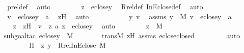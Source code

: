 \begin{isabellebody}
\ prel{\isacharunderscore}{\kern0pt}def\ \isamarkupfalse%
\ auto\ \isanewline
\ \ \ \ \isamarkupfalse%
\ \isamarkupfalse%
\ {\isachardoublequoteopen}z\ {\isasymin}\ eclose{\isacharparenleft}{\kern0pt}y{\isacharparenright}{\kern0pt}{\isachardoublequoteclose}\ \isamarkupfalse%
\ Rrel{\isacharunderscore}{\kern0pt}def\ InEclose{\isacharunderscore}{\kern0pt}def\ \isamarkupfalse%
\ auto\ \isanewline
\ \ \ \ \isamarkupfalse%
\ \isamarkupfalse%
\ {\isachardoublequoteopen}v\ {\isasymin}\ eclose{\isacharparenleft}{\kern0pt}y{\isacharparenright}{\kern0pt}\ {\isasymtimes}\ {\isacharbraceleft}{\kern0pt}a{\isacharbraceright}{\kern0pt}{\isachardoublequoteclose}\ \isamarkupfalse%
\ zH\ \isamarkupfalse%
\ auto\ \isanewline
\ \ \isamarkupfalse%
\ \isanewline
\ \ \ \ \isamarkupfalse%
\ y\ v\ \isamarkupfalse%
\ assms{}{\isacharcolon}{\kern0pt}\ {\isachardoublequoteopen}y\ {\isasymin}\ M{\isachardoublequoteclose}\ {\isachardoublequoteopen}v\ {\isasymin}\ eclose{\isacharparenleft}{\kern0pt}y{\isacharparenright}{\kern0pt}\ {\isasymtimes}\ {\isacharbraceleft}{\kern0pt}a{\isacharbraceright}{\kern0pt}{\isachardoublequoteclose}\ \isanewline
\ \ \ \ \isamarkupfalse%
\ \isamarkupfalse%
\ z\ \ zH\ {\isacharcolon}{\kern0pt}\ {\isachardoublequoteopen}v\ {\isacharequal}{\kern0pt}\ {\isacharless}{\kern0pt}z{\isacharcomma}{\kern0pt}\ a{\isachargreater}{\kern0pt}{\isachardoublequoteclose}\ {\isachardoublequoteopen}z\ {\isasymin}\ eclose{\isacharparenleft}{\kern0pt}y{\isacharparenright}{\kern0pt}{\isachardoublequoteclose}\ \isamarkupfalse%
\ auto\ \isanewline
\ \ \ \ \isamarkupfalse%
\ \isamarkupfalse%
\ {\isachardoublequoteopen}z\ {\isasymin}\ M{\isachardoublequoteclose}\ \isanewline
\ \ \ \ \ \ \isamarkupfalse%
{\isacharparenleft}{\kern0pt}subgoal{\isacharunderscore}{\kern0pt}tac\ {\isachardoublequoteopen}eclose{\isacharparenleft}{\kern0pt}y{\isacharparenright}{\kern0pt}\ {\isasymin}\ M{\isachardoublequoteclose}{\isacharparenright}{\kern0pt}\isanewline
\ \ \ \ \ \ \isamarkupfalse%
\ transM\ zH\ assms{}\ eclose{\isacharunderscore}{\kern0pt}closed\ \isanewline
\ \ \ \ \ \ \isamarkupfalse%
\ auto\ \isanewline
\ \ \ \ \isamarkupfalse%
\ \isamarkupfalse%
\ H\ {\isacharcolon}{\kern0pt}\ {\isachardoublequoteopen}{\isacharless}{\kern0pt}z{\isacharcomma}{\kern0pt}\ y{\isachargreater}{\kern0pt}\ {\isasymin}\ Rrel{\isacharparenleft}{\kern0pt}InEclose{\isacharcomma}{\kern0pt}\ M{\isacharparenright}{\kern0pt}{\isachardoublequoteclose}\ \isanewline

\end{isabellebody}
